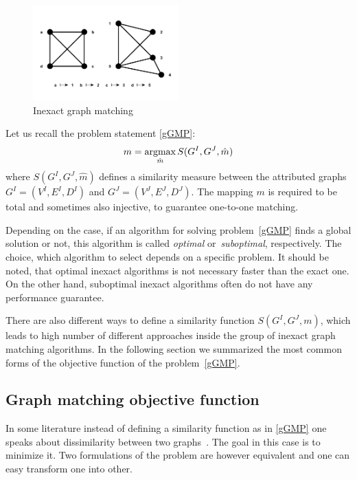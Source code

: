 \vspace{-12pt}
\begin{figure}[htb]
	\centering
	\includegraphics[width=0.5\textwidth]{chapter1/fig/inexactGM}
    \caption{Inexact graph matching}
    \label{fig:inexact_GM}
\end{figure}
\vspace{-10pt}
Let us recall the problem statement \eqref{gGMP}: 
\begin{equation*}
m = \mathop{\rm argmax}_{\hat{m}}S(G^I, G^J, \hat{m})
\end{equation*}
where $S(G^I, G^J, \hat{m})$ defines a similarity measure between the attributed graphs $G^I = (V^I, E^I,D^I)$ and $G^J = (V^J, E^J,D^J)$. The mapping $m$ is required to be total and sometimes also injective, to guarantee one-to-one matching.

Depending on the case, if an algorithm for solving problem~\eqref{gGMP} finds a global solution or not, this algorithm is called \emph{optimal} or~\emph{suboptimal}, respectively. The choice, which algorithm to select depends on a specific problem. It should be noted, that optimal inexact algorithms is not necessary faster than the exact one. On the other hand, suboptimal inexact algorithms often do not have any performance guarantee.

There are also different ways to define a similarity function $S(G^I,G^J,m)$, which leads to high number of different approaches inside the group of inexact graph matching algorithms. In the following section we summarized the most common forms of the objective function of the problem~\eqref{gGMP}.
\subsection{Graph matching objective function}
In some literature instead of defining a similarity function as in \eqref{gGMP} one speaks about dissimilarity between two graphs~\cite{Herault1990_SimulatedAnnealing,FastPFP,Lyzinski2015,Roth2001,Vogelstein_BrainGraphs,Zazlavskiy2008_PATH}. The goal in this case is to minimize it. Two formulations of the problem are however equivalent and one can easy transform one into other.
